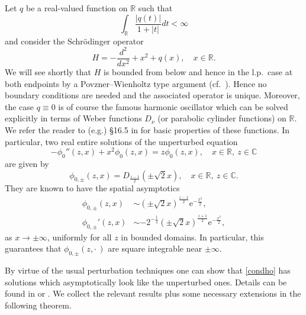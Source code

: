\documentclass{amsart}
\numberwithin{equation}{section}
\begin{document}
Let $q$ be a real-valued function on ${{\mathbb R}}$ such that 
\begin{equation}\label{condho}
  \int_{{\mathbb R}} \frac{|q(t)|}{1+|t|} dt <\infty
\end{equation}
and consider the Schr\"{o}dinger operator
\begin{equation}
 H = - \frac{d^2}{dx^2} + x^2 + q(x), \quad x\in{{\mathbb R}}.
\end{equation}
We will see shortly that $H$ is bounded from below and hence in the l.p.\ case at both endpoints by a Povzner--Wienholtz type argument (cf.\ \cite[Lemma~C.1]{ge}).
Hence no boundary conditions are needed and the associated operator is unique. Moreover, the case $q\equiv 0$ is of course the famous
harmonic oscillator which can be solved explicitly in terms of Weber functions  $D_\nu$ (or parabolic cylinder functions) on ${{\mathbb R}}$. We refer the reader to
(e.g.) \S16.5 in \cite{whwa} for basic properties of these functions. In particular, two real entire solutions of the unperturbed equation
\begin{equation}
- \phi_0''(z,x) + x^2 \phi_0(z,x) = z \phi_0(z,x), \quad x\in{{\mathbb R}},~z\in{{\mathbb C}}
\end{equation}
are given by
\begin{equation}
\phi_{0,\pm}(z,x) = D_{\frac{z-1}{2}}(\pm\sqrt{2}x), \quad x\in{{\mathbb R}},~z\in{{\mathbb C}}.
\end{equation}
They are known to have the spatial asymptotics
 \begin{align}\label{asymD}
  \phi_{0,\pm}(z,x) & \sim (\pm\sqrt{2}x)^{\frac{z-1}{2}} {\mathrm{e}}^{-\frac{x^2}{2}}, \\
   \phi_{0,\pm}'(z,x) & \sim -2^{-\frac{1}{2}} (\pm\sqrt{2}x)^{\frac{z+1}{2}} {\mathrm{e}}^{-\frac{x^2}{2}}, 
\end{align}
as $x\rightarrow\pm\infty$, uniformly for all $z$ in bounded domains. In particular, this guarantees that $\phi_{0,\pm}(z,\cdot\,)$ are square integrable near $\pm\infty$.

By virtue of the usual perturbation techniques one can show that \eqref{condho} has solutions which asymptotically look like
the unperturbed ones. Details can be found in \cite[Section~2]{chelkak} or \cite[Section~3]{ckk}. We collect the relevant results plus some
necessary extensions in the following theorem.
 
\end{document}
